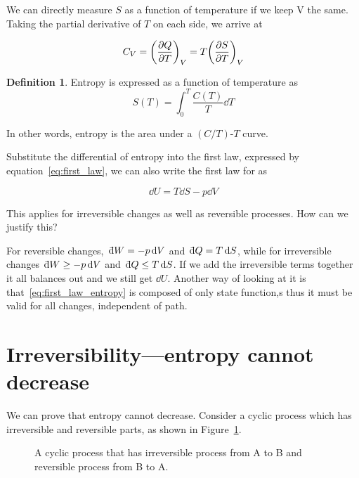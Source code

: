 \documentclass[12pt,chapterprefix=false,dvipsnames]{scrbook}
\theoremstyle{dotless}
\theoremstyle{definition}
\newtheorem{protodefinition}{Definition}[section]
\newenvironment{definition}
{\colorlet{shadecolor}{black!15}\begin{shaded}\begin{protodefinition}}
			{\end{protodefinition}\end{shaded}}
\def\dbar{{\mathchar'26\mkern-10mu \mathrm{d}}}
\begin{document}
We can directly measure $S$ as a function of
temperature if we keep V the same. Taking the partial derivative
of $T$ on each side, we arrive at

\begin{equation}
	C_V = {\left(\pdv{Q}{T}\right)}_V =
	T{\left(\pdv{S}{T}\right)}_V
\end{equation}

\begin{definition}
	Entropy is expressed as a function of temperature as
	\begin{equation}
		\label{eq:entropy_from_temperature}
		S(T) = \int_0^T\frac{C(T)}{T}\dd{T}
	\end{equation}
\end{definition}

In other words, entropy is the area under a
$(C/T)$-$T$ curve.

Substitute the differential of entropy into the first law,
expressed by equation~\ref{eq:first_law}, we can also write
the first law for as

\begin{equation}
	\label{eq:first_law_entropy}
	\dd{U} = T\dd{S} -
	p\dd{V}
\end{equation}

This applies for irreversible changes as well as reversible
processes. How can we justify this?

For reversible changes,\, $\dbar W = -p\dd{V}$ and\,
$\dbar Q = T \dd{S}$, while for irreversible changes\,
$\dbar W \geq -p\dd{V}$ and\, $\dbar Q \leq T\dd{S}$. If we add
the irreversible terms together it all balances out and we still
get $\dd{U}$. Another way of looking at it is
that~\ref{eq:first_law_entropy} is composed of only state
function,s thus it must be valid for all changes, independent of
path.

\section{Irreversibility---entropy cannot decrease}%
\label{sec:irreversibility}

We can prove that entropy cannot decrease. Consider a cyclic
process which has irreversible and reversible parts, as shown in
Figure~\ref{fig:entropy_cannot_decrease}.

\begin{figure}[htpb]
	\centering
	
	\caption{A cyclic process that has irreversible process from A to B and
		reversible process from B to A.}%
	\label{fig:entropy_cannot_decrease}
\end{figure}
\end{document}
